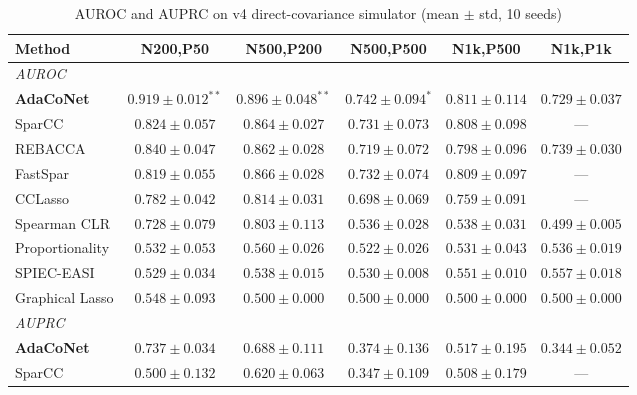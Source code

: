 \documentclass[unnumsec,webpdf,contemporary,large,numbered]{oup-authoring-template}
\theoremstyle{plain}
\theoremstyle{definition}
\begin{document}
\begin{table}[!t]
\caption{AUROC and AUPRC on v4 direct-covariance simulator (mean $\pm$ std, 10 seeds)}\label{tab:v4}
\centering
\small
\setlength{\tabcolsep}{3pt}
\begin{tabular}{@{}lccccc@{}}
\toprule
\textbf{Method} & \textbf{N200,P50} & \textbf{N500,P200} & \textbf{N500,P500} & \textbf{N1k,P500} & \textbf{N1k,P1k} \\
\midrule
\multicolumn{6}{l}{\textit{AUROC}} \\
\textbf{AdaCoNet}    & $\mathbf{0.919 \pm 0.012}^{**}$ & $\mathbf{0.896 \pm 0.048}^{**}$ & $\mathbf{0.742 \pm 0.094}^{*}$ & $\mathbf{0.811 \pm 0.114}$ & $0.729 \pm 0.037$ \\
SparCC               & $0.824 \pm 0.057$          & $0.864 \pm 0.027$          & $0.731 \pm 0.073$       & $0.808 \pm 0.098$       & --- \\
REBACCA              & $0.840 \pm 0.047$          & $0.862 \pm 0.028$          & $0.719 \pm 0.072$       & $0.798 \pm 0.096$       & $\mathbf{0.739 \pm 0.030}$ \\
FastSpar             & $0.819 \pm 0.055$          & $\mathbf{0.866 \pm 0.028}$ & $0.732 \pm 0.074$       & $0.809 \pm 0.097$       & --- \\
CCLasso              & $0.782 \pm 0.042$          & $0.814 \pm 0.031$          & $0.698 \pm 0.069$       & $0.759 \pm 0.091$       & --- \\
Spearman CLR         & $0.728 \pm 0.079$          & $0.803 \pm 0.113$          & $0.536 \pm 0.028$       & $0.538 \pm 0.031$       & $0.499 \pm 0.005$ \\
Proportionality      & $0.532 \pm 0.053$          & $0.560 \pm 0.026$          & $0.522 \pm 0.026$       & $0.531 \pm 0.043$       & $0.536 \pm 0.019$ \\
SPIEC-EASI           & $0.529 \pm 0.034$          & $0.538 \pm 0.015$          & $0.530 \pm 0.008$       & $0.551 \pm 0.010$       & $0.557 \pm 0.018$ \\
Graphical Lasso      & $0.548 \pm 0.093$          & $0.500 \pm 0.000$          & $0.500 \pm 0.000$       & $0.500 \pm 0.000$       & $0.500 \pm 0.000$ \\
\midrule
\multicolumn{6}{l}{\textit{AUPRC}} \\
\textbf{AdaCoNet}    & $\mathbf{0.737 \pm 0.034}$ & $\mathbf{0.688 \pm 0.111}$ & $\mathbf{0.374 \pm 0.136}$ & $\mathbf{0.517 \pm 0.195}$ & $\mathbf{0.344 \pm 0.052}$ \\
SparCC               & $0.500 \pm 0.132$          & $0.620 \pm 0.063$          & $0.347 \pm 0.109$       & $0.508 \pm 0.179$       & --- \\

\end{tabular}
\end{table}
\end{document}

